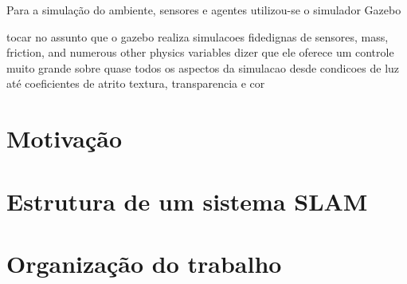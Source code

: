 Para a simulação do ambiente, sensores e agentes utilizou-se o simulador Gazebo \cite{Koenig-2004-394}

tocar no assunto que o gazebo realiza simulacoes fidedignas de sensores, mass, 
friction, and numerous other physics variables
dizer que ele oferece um controle muito grande sobre quase todos os aspectos 
da simulacao desde condicoes de luz até coeficientes de atrito
textura, transparencia e cor

\section{Motivação}

\section{Estrutura de um sistema SLAM}

\section{Organização do trabalho}